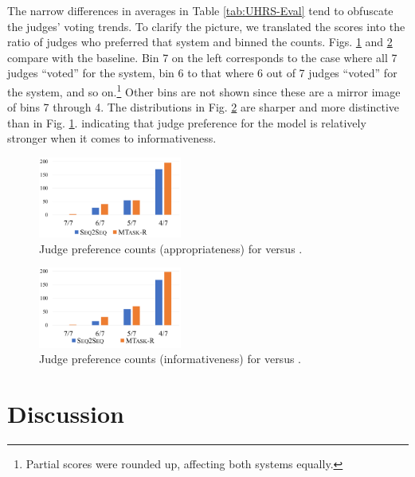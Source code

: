 \documentclass[letterpaper]{article}
\begin{document}
The narrow differences in averages in Table \ref{tab:UHRS-Eval} tend to obfuscate the judges' voting trends.
To clarify the picture, we translated the scores into the ratio of judges who preferred that system and binned the counts.
Figs. \ref{fig:mem-tweets-app} and \ref{fig:mem-tweets-inf} compare \MTaskR with the \sts baseline.
Bin 7 on the left corresponds to the case where all 7 judges ``voted'' for the system, bin 6 to that where 6 out of 7 judges ``voted'' for the system, and so on.\footnote{Partial scores were rounded up,  affecting both systems equally.}
Other bins are not shown since these are a mirror image of bins 7 through 4.
The distributions in Fig. \ref{fig:mem-tweets-inf} are sharper and more distinctive than in  Fig. \ref{fig:mem-tweets-app}. indicating that judge preference for the \MTaskR model is relatively stronger when it comes to informativeness.

\begin{figure}
\centering
\includegraphics[width=0.42\textwidth]{mem-tweets-app-emb.pdf}
\caption{Judge preference counts (appropriateness) for \MTaskR versus \sts.}
\label{fig:mem-tweets-app}
\end{figure}

\begin{figure}
\centering
\includegraphics[width=0.42\textwidth]{mem-tweets-inf-emb.pdf}
\caption{Judge preference counts (informativeness) for \MTaskR versus \sts.}
\label{fig:mem-tweets-inf}
\end{figure}

\section{Discussion}
\end{document}
